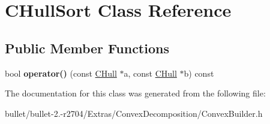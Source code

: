 \hypertarget{class_c_hull_sort}{\section{C\+Hull\+Sort Class Reference}
\label{class_c_hull_sort}
}
\subsection*{Public Member Functions}
\begin{DoxyCompactItemize}
\item 
\hypertarget{class_c_hull_sort_aa5de23224fa2388336df7b6bccc94d59}{bool {\bfseries operator()} (const \hyperlink{class_c_hull}{C\+Hull} $\ast$a, const \hyperlink{class_c_hull}{C\+Hull} $\ast$b) const }\label{class_c_hull_sort_aa5de23224fa2388336df7b6bccc94d59}

\end{DoxyCompactItemize}


The documentation for this class was generated from the following file\+:\begin{DoxyCompactItemize}
\item 
bullet/bullet-\/2.-\/r2704/\+Extras/\+Convex\+Decomposition/Convex\+Builder.\+h\end{DoxyCompactItemize}
